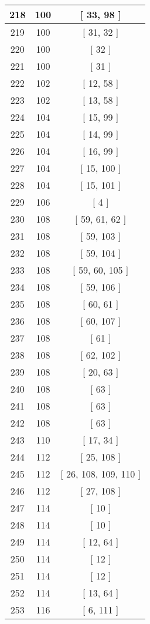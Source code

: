 \begin{center}
\begin{longtable}[H]{|| c c c ||}
\hline
218 & 100 & [ 33, 98 ] \\ 
\hline
219 & 100 & [ 31, 32 ] \\ 
\hline
220 & 100 & [ 32 ] \\ 
\hline
221 & 100 & [ 31 ] \\ 
\hline
222 & 102 & [ 12, 58 ] \\ 
\hline
223 & 102 & [ 13, 58 ] \\ 
\hline
224 & 104 & [ 15, 99 ] \\ 
\hline
225 & 104 & [ 14, 99 ] \\ 
\hline
226 & 104 & [ 16, 99 ] \\ 
\hline
227 & 104 & [ 15, 100 ] \\ 
\hline
228 & 104 & [ 15, 101 ] \\ 
\hline
229 & 106 & [ 4 ] \\ 
\hline
230 & 108 & [ 59, 61, 62 ] \\ 
\hline
231 & 108 & [ 59, 103 ] \\ 
\hline
232 & 108 & [ 59, 104 ] \\ 
\hline
233 & 108 & [ 59, 60, 105 ] \\ 
\hline
234 & 108 & [ 59, 106 ] \\ 
\hline
235 & 108 & [ 60, 61 ] \\ 
\hline
236 & 108 & [ 60, 107 ] \\ 
\hline
237 & 108 & [ 61 ] \\ 
\hline
238 & 108 & [ 62, 102 ] \\ 
\hline
239 & 108 & [ 20, 63 ] \\ 
\hline
240 & 108 & [ 63 ] \\ 
\hline
241 & 108 & [ 63 ] \\ 
\hline
242 & 108 & [ 63 ] \\ 
\hline
243 & 110 & [ 17, 34 ] \\ 
\hline
244 & 112 & [ 25, 108 ] \\ 
\hline
245 & 112 & [ 26, 108, 109, 110 ] \\ 
\hline
246 & 112 & [ 27, 108 ] \\ 
\hline
247 & 114 & [ 10 ] \\ 
\hline
248 & 114 & [ 10 ] \\ 
\hline
249 & 114 & [ 12, 64 ] \\ 
\hline
250 & 114 & [ 12 ] \\ 
\hline
251 & 114 & [ 12 ] \\ 
\hline
252 & 114 & [ 13, 64 ] \\ 
\hline
253 & 116 & [ 6, 111 ] \\ 

\end{longtable}
\end{center}
